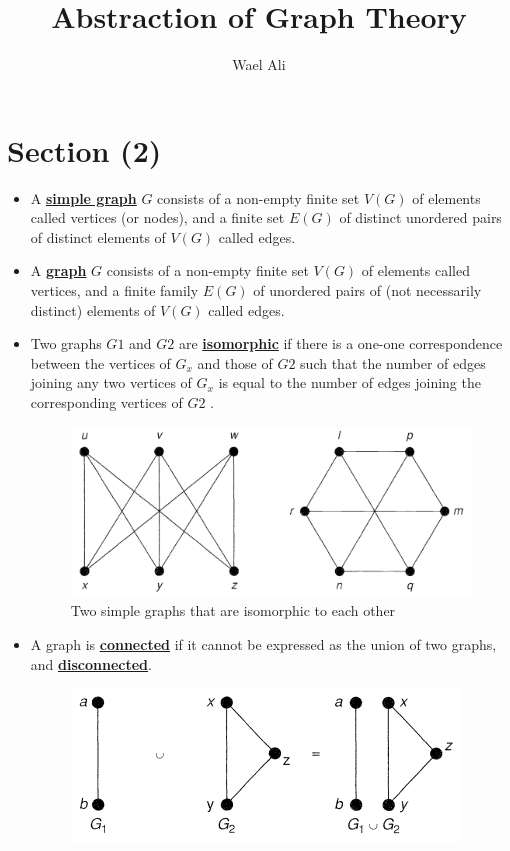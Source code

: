 \documentclass[12pt,a4paper, twocolumn]{article}
\author{Wael Ali}
\date{}
\title{Abstraction of Graph Theory}
\begin{document}
\newcommand{\hsplit}{\rule{\linewidth}{1pt}\\}

\maketitle
\section*{Section (2)}
\begin{itemize}
\item A \underline{\textbf{simple graph}} $G$ consists of a non-empty finite set $V(G)$ of elements called vertices
(or nodes), and a finite set $E(G)$ of distinct unordered pairs of distinct elements of $V(G)$ called edges.
\item A \underline{\textbf{graph}} $G$ consists of a non-empty finite set $V(G)$ of elements called vertices, and a finite family $E(G)$ of unordered pairs of (not necessarily distinct) elements of $V(G)$ called edges.
\item Two graphs $G1$ and $G2$ are \underline{\textbf{isomorphic}} if there is a one-one correspondence between the vertices of $G_x$ and those of $G2$ such that the number of edges joining any two vertices of $G_x$ is equal to the number of edges joining the corresponding vertices of $G2$ .
	\begin{figure}[h!]
	\centering
	\includegraphics[scale=0.4]{figures/isomorphism1.png}
	\caption{Two simple graphs that are isomorphic to each other}
	\end{figure}
\item A graph is \underline{\textbf{connected}} if it cannot be expressed as the union of two graphs, and \underline{\textbf{disconnected}}.
	\begin{figure}[h!]
	\centering
	\includegraphics[scale=0.5]{figures/graphUion.png}

\end{figure}
\end{itemize}
\end{document}
